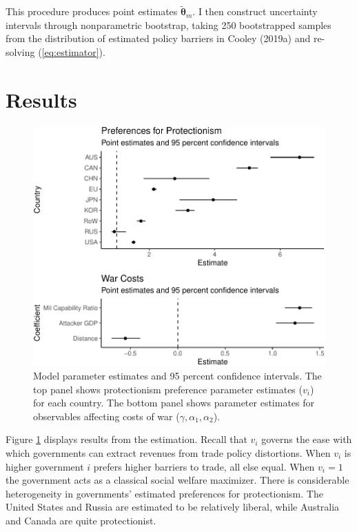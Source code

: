 \documentclass{puthesis}
\begin{document}
This procedure produces point estimates \(\tilde{\bm{\theta}}_m\). I
then construct uncertainty intervals through nonparametric bootstrap,
taking 250 bootstrapped samples from the distribution of estimated
policy barriers in Cooley (2019a) and re-solving (\ref{eq:estimator}).

\section{Results}

\begin{figure}
\centering
\includegraphics{figure/ests-1.pdf}
\caption{Model parameter estimates and 95 percent confidence intervals.
The top panel shows protectionism preference parameter estimates
(\(v_i\)) for each country. The bottom panel shows parameter estimates
for observables affecting costs of war (\(\gamma, \alpha_1, \alpha_2\)).
\label{fig:ests}}
\end{figure}

Figure \ref{fig:ests} displays results from the estimation. Recall that
\(v_i\) governs the ease with which governments can extract revenues
from trade policy distortions. When \(v_i\) is higher government \(i\)
prefers higher barriers to trade, all else equal. When \(v_i=1\) the
government acts as a classical social welfare maximizer. There is
considerable heterogeneity in governments' estimated preferences for
protectionism. The United States and Russia are estimated to be
relatively liberal, while Australia and Canada are quite protectionist.
\end{document}

